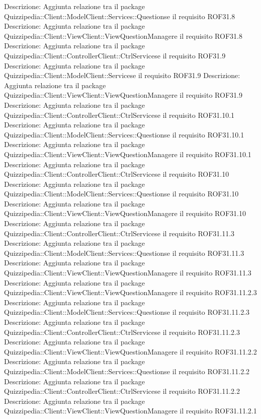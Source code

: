 Descrizione: Aggiunta relazione tra il package Quizzipedia::Client::ModelClient::Services::Questionse il requisito ROF31.8 
Descrizione: Aggiunta relazione tra il package Quizzipedia::Client::ViewClient::ViewQuestionManagere il requisito ROF31.8 
Descrizione: Aggiunta relazione tra il package Quizzipedia::Client::ControllerClient::CtrlServicese il requisito ROF31.9 
Descrizione: Aggiunta relazione tra il package Quizzipedia::Client::ModelClient::Servicese il requisito ROF31.9 
Descrizione: Aggiunta relazione tra il package Quizzipedia::Client::ViewClient::ViewQuestionManagere il requisito ROF31.9 
Descrizione: Aggiunta relazione tra il package Quizzipedia::Client::ControllerClient::CtrlServicese il requisito ROF31.10.1 
Descrizione: Aggiunta relazione tra il package Quizzipedia::Client::ModelClient::Services::Questionse il requisito ROF31.10.1 
Descrizione: Aggiunta relazione tra il package Quizzipedia::Client::ViewClient::ViewQuestionManagere il requisito ROF31.10.1 
Descrizione: Aggiunta relazione tra il package Quizzipedia::Client::ControllerClient::CtrlServicese il requisito ROF31.10 
Descrizione: Aggiunta relazione tra il package Quizzipedia::Client::ModelClient::Services::Questionse il requisito ROF31.10 
Descrizione: Aggiunta relazione tra il package Quizzipedia::Client::ViewClient::ViewQuestionManagere il requisito ROF31.10 
Descrizione: Aggiunta relazione tra il package Quizzipedia::Client::ControllerClient::CtrlServicese il requisito ROF31.11.3 
Descrizione: Aggiunta relazione tra il package Quizzipedia::Client::ModelClient::Services::Questionse il requisito ROF31.11.3 
Descrizione: Aggiunta relazione tra il package Quizzipedia::Client::ViewClient::ViewQuestionManagere il requisito ROF31.11.3 
Descrizione: Aggiunta relazione tra il package Quizzipedia::Client::ViewClient::ViewQuestionManagere il requisito ROF31.11.2.3 
Descrizione: Aggiunta relazione tra il package Quizzipedia::Client::ModelClient::Services::Questionse il requisito ROF31.11.2.3 
Descrizione: Aggiunta relazione tra il package Quizzipedia::Client::ControllerClient::CtrlServicese il requisito ROF31.11.2.3 
Descrizione: Aggiunta relazione tra il package Quizzipedia::Client::ViewClient::ViewQuestionManagere il requisito ROF31.11.2.2 
Descrizione: Aggiunta relazione tra il package Quizzipedia::Client::ModelClient::Services::Questionse il requisito ROF31.11.2.2 
Descrizione: Aggiunta relazione tra il package Quizzipedia::Client::ControllerClient::CtrlServicese il requisito ROF31.11.2.2 
Descrizione: Aggiunta relazione tra il package Quizzipedia::Client::ViewClient::ViewQuestionManagere il requisito ROF31.11.2.1 
